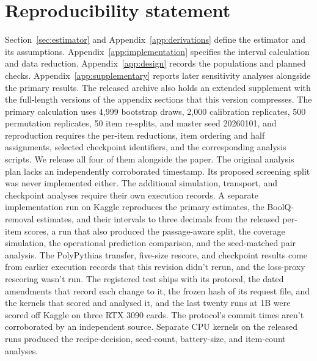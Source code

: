 \documentclass{article}
\begin{document}
\section*{Reproducibility statement}
Section~\ref{sec:estimator} and Appendix~\ref{app:derivations} define the estimator and its assumptions. Appendix~\ref{app:implementation} specifies the interval calculation and data reduction. Appendix~\ref{app:design} records the populations and planned checks. Appendix~\ref{app:supplementary} reports later sensitivity analyses alongside the primary results. The released archive also holds an extended supplement with the full-length versions of the appendix sections that this version compresses. The primary calculation uses 4,999 bootstrap draws, 2,000 calibration replicates, 500 permutation replicates, 50 item re-splits, and master seed 20260101, and reproduction requires the per-item reductions, item ordering and half assignments, selected checkpoint identifiers, and the corresponding analysis scripts. We release all four of them alongside the paper. The original analysis plan lacks an independently corroborated timestamp. Its proposed screening split was never implemented either. The additional simulation, transport, and checkpoint analyses require their own execution records. A separate implementation run on Kaggle reproduces the primary estimates, the BoolQ-removal estimates, and their intervals to three decimals from the released per-item scores, a run that also produced the passage-aware split, the coverage simulation, the operational prediction comparison, and the seed-matched pair analysis. The PolyPythias transfer, five-size rescore, and checkpoint results come from earlier execution records that this revision didn't rerun, and the loss-proxy rescoring wasn't run. The registered test ships with its protocol, the dated amendments that record each change to it, the frozen hash of its request file, and the kernels that scored and analysed it, and the last twenty runs at 1B were scored off Kaggle on three RTX 3090 cards. The protocol's commit times aren't corroborated by an independent source. Separate CPU kernels on the released runs produced the recipe-decision, seed-count, battery-size, and item-count analyses.


\clearpage
\appendix


\end{document}
